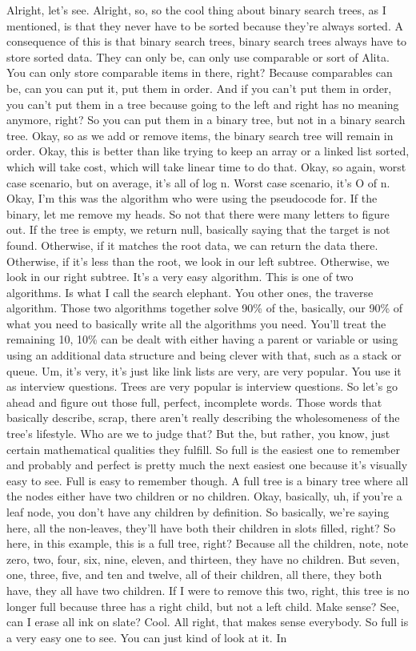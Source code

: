 Alright, let's see. Alright, so, so the cool thing about binary search trees, as I mentioned, is that they never have to be sorted because they're always sorted. A consequence of this is that binary search trees, binary search trees always have to store sorted data. They can only be, can only use comparable or sort of Alita. You can only store comparable items in there, right? Because comparables can be, can you can put it, put them in order. And if you can't put them in order, you can't put them in a tree because going to the left and right has no meaning anymore, right? So you can put them in a binary tree, but not in a binary search tree. Okay, so as we add or remove items, the binary search tree will remain in order. Okay, this is better than like trying to keep an array or a linked list sorted, which will take cost, which will take linear time to do that. Okay, so again, worst case scenario, but on average, it's all of log n. Worst case scenario, it's O of n. Okay, I'm this was the algorithm who were using the pseudocode for. If the binary, let me remove my heads. So not that there were many letters to figure out. If the tree is empty, we return null, basically saying that the target is not found. Otherwise, if it matches the root data, we can return the data there. Otherwise, if it's less than the root, we look in our left subtree. Otherwise, we look in our right subtree. It's a very easy algorithm. This is one of two algorithms. Is what I call the search elephant. You other ones, the traverse algorithm. Those two algorithms together solve 90\% of the, basically, our 90\% of what you need to basically write all the algorithms you need. You'll treat the remaining 10, 10\% can be dealt with either having a parent or variable or using using an additional data structure and being clever with that, such as a stack or queue. Um, it's very, it's just like link lists are very, are very popular. You use it as interview questions. Trees are very popular is interview questions. So let's go ahead and figure out those full, perfect, incomplete words. Those words that basically describe, scrap, there aren't really describing the wholesomeness of the tree's lifestyle. Who are we to judge that? But the, but rather, you know, just certain mathematical qualities they fulfill. So full is the easiest one to remember and probably and perfect is pretty much the next easiest one because it's visually easy to see. Full is easy to remember though. A full tree is a binary tree where all the nodes either have two children or no children. Okay, basically, uh, if you're a leaf node, you don't have any children by definition. So basically, we're saying here, all the non-leaves, they'll have both their children in slots filled, right? So here, in this example, this is a full tree, right? Because all the children, note, note zero, two, four, six, nine, eleven, and thirteen, they have no children. But seven, one, three, five, and ten and twelve, all of their children, all there, they both have, they all have two children. If I were to remove this two, right, this tree is no longer full because three has a right child, but not a left child. Make sense? See, can I erase all ink on slate? Cool. All right, that makes sense everybody. So full is a very easy one to see. You can just kind of look at it. In 